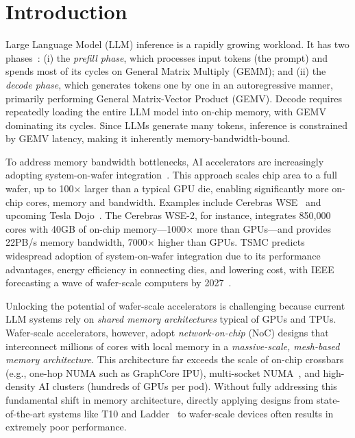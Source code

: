 \section{Introduction}
\vspace{-0.3cm}
Large Language Model (LLM) inference is a rapidly growing workload. It has two phases~\cite{flashdecoding++}: (i) the \textit{prefill phase}, which processes input tokens (the prompt) and spends most of its cycles on General Matrix Multiply (GEMM); and (ii) the \textit{decode phase}, which generates tokens one by one in an autoregressive manner, primarily performing General Matrix-Vector Product (GEMV). Decode requires repeatedly loading the entire LLM model into on-chip memory, with GEMV dominating its cycles. Since LLMs generate many tokens, inference is constrained by GEMV latency, making it inherently memory-bandwidth-bound.

To address memory bandwidth bottlenecks, AI accelerators are increasingly adopting system-on-wafer integration~\cite{tsmc-advanced-packaging}. This approach scales chip area to a full wafer, up to 100$\times$ larger than a typical GPU die, enabling significantly more on-chip cores, memory and bandwidth. Examples include Cerebras WSE~\cite{wse} and upcoming Tesla Dojo~\cite{dojo}. The Cerebras WSE-2, for instance, integrates 850,000 cores with 40GB of on-chip memory—1000$\times$ more than GPUs—and provides 22PB/s memory bandwidth, 7000$\times$ higher than GPUs. TSMC predicts widespread adoption of system-on-wafer integration due to its performance advantages, energy efficiency in connecting dies, and lowering cost, with IEEE forecasting a wave of wafer-scale computers by 2027~\cite{tsmc-advanced-packaging}.

Unlocking the potential of wafer-scale accelerators is challenging because current LLM systems rely on \emph{shared memory architectures} typical of GPUs and TPUs. Wafer-scale accelerators, however, adopt \emph{network-on-chip} (NoC) designs that interconnect millions of cores with local memory in a \emph{massive-scale, mesh-based memory architecture}. This architecture far exceeds the scale of on-chip crossbars (e.g., one-hop NUMA such as GraphCore IPU), multi-socket NUMA~\cite{amd2023numa}, and high-density AI clusters (hundreds of GPUs per pod)\cite{tpu}. Without fully addressing this fundamental shift in memory architecture, directly applying designs from state-of-the-art systems like T10\cite{t10} and Ladder~\cite{ladder} to wafer-scale devices often results in extremely poor performance.

